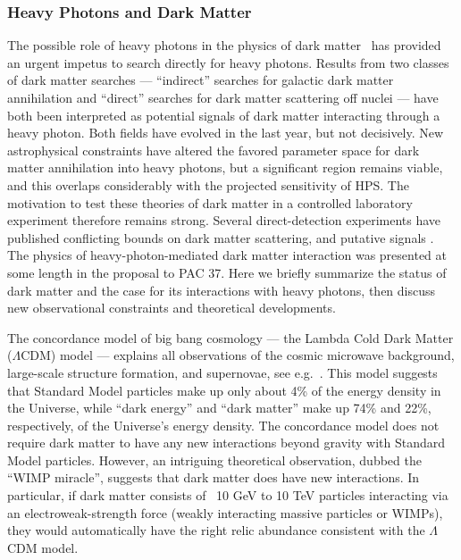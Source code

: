 \subsubsection{Heavy Photons and Dark Matter}

The possible role of heavy photons in the physics of dark matter~\cite{ArkaniHamed:2008qn,Pospelov:2008jd} has provided an urgent impetus to search directly for heavy photons.  Results from two classes of dark matter searches --- ``indirect'' searches for galactic dark matter annihilation and ``direct'' searches for dark matter scattering off nuclei --- have both been interpreted as potential signals of dark matter interacting through a heavy photon.  Both fields have evolved in the last year, but not decisively.  New astrophysical constraints have altered the favored parameter space for dark matter annihilation into heavy photons, but a significant region remains viable, and this overlaps considerably with the projected sensitivity of HPS.  The motivation to test these theories of dark matter in a controlled laboratory experiment therefore remains strong.    Several direct-detection experiments have published conflicting bounds on dark matter scattering, and putative signals
 .  The physics of heavy-photon-mediated dark matter interaction was presented at some length in the proposal to PAC 37.  Here we briefly summarize the status of dark matter and the case for its interactions with heavy photons,  then discuss new observational constraints and theoretical developments.

The concordance model of big bang cosmology --- the Lambda Cold Dark Matter ($\Lambda$CDM) model --- explains all observations of the cosmic microwave background, large-scale structure formation, and supernovae, see 
e.g.~\cite{LambdaCDMData}. This model suggests that Standard Model particles make up only about 4\% of the energy density in the Universe, while ``dark energy'' and ``dark matter'' make up 74\% and 22\%, respectively, of the Universe's energy density. The concordance model does not require dark matter to have any new interactions beyond gravity with Standard Model particles. However, an intriguing theoretical observation, dubbed the ``WIMP miracle'', suggests that dark matter does have new interactions. In particular, if dark matter consists of ~10 GeV to 10 TeV particles interacting via an electroweak-strength force (weakly interacting massive particles or WIMPs), they would automatically have the right relic abundance consistent with the $\Lambda$CDM model.

